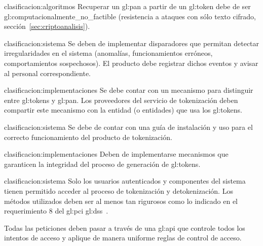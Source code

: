 {clasificacion:algoritmos}
{
  Recuperar un \gls{gl:pan} a partir de un \gls{gl:token} debe de ser
  \gls{gl:computacionalmente_no_factible} (resistencia a ataques con sólo
  texto cifrado, sección~\ref{sec:criptoanalisis}).
}

{clasificacion:sistema}
{
  Se deben de implementar disparadores que permitan detectar
  irregularidades en el sistema (anomalías, funcionamientos erróneos,
  comportamientos sospechosos). El producto debe registrar dichos eventos y
  avisar al personal correspondiente.
}

{clasificacion:implementaciones}
{
  Se debe contar con un mecanismo para distinguir entre \glspl{gl:token}
  y \gls{gl:pan}. Los proveedores del servicio de tokenización deben
  compartir este mecanismo con la entidad (o entidades) que usa los
  \glspl{gl:token}.
}

{clasificacion:sistema}
{
  Se debe de contar con una guía de instalación y uso para el correcto
  funcionamiento del producto de tokenización.
}

{clasificacion:implementaciones}
{
  Deben de implementarse mecanismos que garanticen la integridad del proceso
  de generación de \glspl{gl:token}.
}

{clasificacion:sistema}
{
  Solo los usuarios autenticados y componentes del sistema tienen permitido
  acceder al proceso de tokenización y detokenización. Los métodos utilizados
  deben ser al menos tan rigurosos como lo indicado en el requerimiento 8 del
  \gls{gl:pci} \gls{gl:dss}~\cite{pci_dss}.
}

{
  Todas las peticiones deben pasar a través de una \gls{gl:api} que controle
  todos los intentos de acceso y aplique de manera uniforme reglas de
  control de acceso.
}

